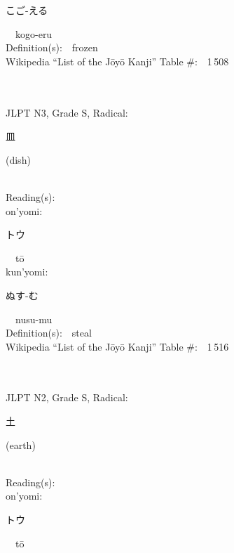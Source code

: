 \begin{multicols}{2}
{\hspace*{2em}}{\begin{CJK}{UTF8}{min} こご-える \end{CJK}}\ \ kogo-eru\ \ \\
Definition(s):\ \ frozen \\
Wikipedia ``List of the J\=oy\=o Kanji'' Table \#:\ \ 1\,508 \\
\ \ \\
{\fontsize{34pt}{40pt}  }\ \ \\  %
{JLPT N3, Grade S, Radical:\ \ {\begin{CJK}{UTF8}{min} 皿 \end{CJK}} (dish) } \\
Reading(s):\ \ \\
{\hspace*{1em}}on'yomi:\ \ \\
{\hspace*{2em}}{\begin{CJK}{UTF8}{min} トウ \end{CJK}}\ \ t\=o\ \ \\
{\hspace*{1em}}kun'yomi:\ \ \\
{\hspace*{2em}}{\begin{CJK}{UTF8}{min} ぬす-む \end{CJK}}\ \ nusu-mu\ \ \\
Definition(s):\ \ steal \\
Wikipedia ``List of the J\=oy\=o Kanji'' Table \#:\ \ 1\,516 \\
\ \ \\
{\fontsize{34pt}{40pt}  }\ \ \\  %
{JLPT N2, Grade S, Radical:\ \ {\begin{CJK}{UTF8}{min} 土 \end{CJK}} (earth) } \\
Reading(s):\ \ \\
{\hspace*{1em}}on'yomi:\ \ \\
{\hspace*{2em}}{\begin{CJK}{UTF8}{min} トウ \end{CJK}}\ \ t\=o\ \ \\

\end{multicols}
